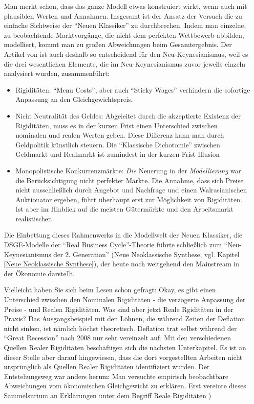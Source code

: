 Man merkt schon, dass das ganze Modell etwas konstruiert wirkt, wenn auch mit plausiblen Werten und Annahmen. Insgesamt ist der Ansatz der Versuch die zu einfache Sichtweise der "`Neuen Klassiker"' zu durchbrechen. Indem man einzelne, zu beobachtende Marktvorgänge, die nicht dem perfekten Wettbewerb abbilden, modelliert, kommt man zu großen Abweichungen beim Gesamtergebnis. Der Artikel von \textcite{RomerDavid1990} ist auch deshalb so entscheidend für den Neu-Keynesianismus, weil es die drei wesentlichen Elemente, die im Neu-Keynesianismus zuvor jeweils einzeln analysiert wurden, zusammenführt:
\begin{itemize}
	\item Rigiditäten: "`Menu Costs"', aber auch "`Sticky Wages"' verhindern die sofortige Anpassung an den Gleichgewichtspreis.
	\item Nicht Neutralität des Geldes: Abgeleitet durch die akzeptierte Existenz der Rigiditäten, muss es in der kurzen Frist einen Unterschied zwischen nominalen und realen Werten geben. Diese Differenz kann man durch Geldpolitik künstlich steuern. Die "`Klassische Dichotomie"' zwischen Geldmarkt und Realmarkt ist zumindest in der kurzen Frist Illusion
	\item Monopolistische Konkurrenzmärkte: \textit{Die} Neuerung in der \textit{Modellierung} war die Berücksichtigung nicht perfekter Märkte. Die Annahme, dass sich Preise nicht ausschließlich durch Angebot und Nachfrage und einen Walrasianischen Auktionator ergeben, führt überhaupt erst zur Möglichkeit von Rigiditäten. Ist aber im Hinblick auf die meisten Gütermärkte und den Arbeitsmarkt realistischer.
\end{itemize}
Die Einbettung dieses Rahmenwerks in die Modellwelt der Neuen Klassiker, die DSGE-Modelle der "`Real Business Cycle"'-Theorie führte schließlich zum "`Neu-Keynesianismus der 2. Generation"' (Neue Neoklassische Synthese, vgl. Kapitel \ref{Neue Neoklassische Synthese}), der heute noch weitgehend den Mainstream in der Ökonomie darstellt.

Vielleicht haben Sie sich beim Lesen schon gefragt: Okay, es gibt einen Unterschied zwischen den Nominalen Rigiditäten - die verzögerte Anpassung der Preise - und Realen Rigiditäten. Was sind aber jetzt Reale Rgiditäten in der Praxis? Das Ausgangsbeispiel mit den Löhnen, die während Zeiten der Deflation nicht sinken, ist nämlich höchst theoretisch. Deflation trat selbst während der "`Great Recession"' nach 2008 nur sehr vereinzelt auf.
Mit den verschiedenen Quellen Realer Rigiditäten beschäftigen sich die nächsten Unterkapitel. Es ist an dieser Stelle aber darauf hingewiesen, dass die dort vorgestellten Arbeiten nicht ursprünglich als Quellen Realer Rigiditäten identifiziert wurden. Der Entstehungsweg war anders herum: Man versuchte empirisch beobachtbare Abweichungen vom ökonomischen Gleichgewicht zu erklären. Erst \textcite{RomerDavid1990} vereinte dieses Sammelsurium an Erklärungen unter dem Begriff Reale Rigiditäten \textcite[S. 4]{Mankiw1991})



